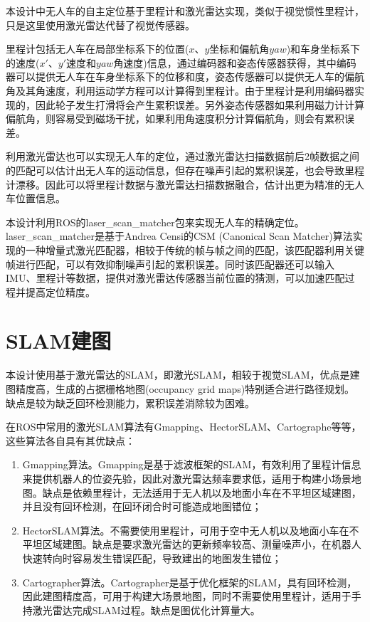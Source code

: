 本设计中无人车的自主定位基于里程计和激光雷达实现，类似于视觉惯性里程计，只是这里使用激光雷达代替了视觉传感器。

里程计包括无人车在局部坐标系下的位置($x$、$y$坐标和偏航角$yaw$)和车身坐标系下的速度($x'$、$y'$速度和$yaw$角速度)信息，通过编码器和姿态传感器获得，其中编码器可以提供无人车在车身坐标系下的位移和度，姿态传感器可以提供无人车的偏航角及其角速度，利用运动学方程可以计算得到里程计。由于里程计是利用编码器实现的，因此轮子发生打滑将会产生累积误差。另外姿态传感器如果利用磁力计计算偏航角，则容易受到磁场干扰，如果利用角速度积分计算偏航角，则会有累积误差。

利用激光雷达也可以实现无人车的定位，通过激光雷达扫描数据前后2帧数据之间的匹配可以估计出无人车的运动信息，但存在噪声引起的累积误差，也会导致里程计漂移。因此可以将里程计数据与激光雷达扫描数据融合，估计出更为精准的无人车位置信息。

本设计利用ROS的laser\_scan\_matcher包来实现无人车的精确定位。laser\_scan\_matcher是基于Andrea Censi的CSM (Canonical Scan Matcher)算法实现的一种增量式激光匹配器，相较于传统的帧与帧之间的匹配，该匹配器利用关键帧进行匹配，可以有效抑制噪声引起的累积误差。同时该匹配器还可以输入IMU、里程计等数据，提供对激光雷达传感器当前位置的猜测，可以加速匹配过程并提高定位精度。

\section{SLAM建图}
本设计使用基于激光雷达的SLAM，即激光SLAM，相较于视觉SLAM，优点是建图精度高，生成的占据栅格地图(occupancy grid maps)特别适合进行路径规划。缺点是较为缺乏回环检测能力，累积误差消除较为困难。

在ROS中常用的激光SLAM算法有Gmapping、HectorSLAM、Cartographe等等，这些算法各自具有其优缺点：

\begin{enumerate}[label=(\arabic*)] 
	\item Gmapping算法。Gmapping是基于滤波框架的SLAM，有效利用了里程计信息来提供机器人的位姿先验，因此对激光雷达频率要求低，适用于构建小场景地图。缺点是依赖里程计，无法适用于无人机以及地面小车在不平坦区域建图，并且没有回环检测，在回环闭合时可能造成地图错位；
	\item HectorSLAM算法。不需要使用里程计，可用于空中无人机以及地面小车在不平坦区域建图。缺点是要求激光雷达的更新频率较高、测量噪声小，在机器人快速转向时容易发生错误匹配，导致建出的地图发生错位；
	\item Cartographer算法。Cartographer是基于优化框架的SLAM，具有回环检测，因此建图精度高，可用于构建大场景地图，同时不需要使用里程计，适用于手持激光雷达完成SLAM过程。缺点是图优化计算量大。
\end{enumerate}

